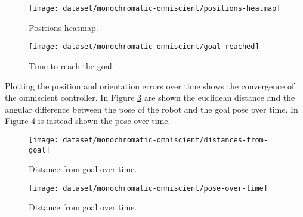 \begin{figure}[htbp]
\centerline{\texttt{[image: dataset/monochromatic-omniscient/positions-heatmap]}}
	\caption{Positions heatmap.}
	\label{fig:densisy-omniscient}
\end{figure}


\begin{figure}[htbp]
\centerline{\texttt{[image: dataset/monochromatic-omniscient/goal-reached]}}
	\caption{Time to reach the goal.}
	\label{fig:goal-reached-omniscient}
\end{figure}

Plotting the position and orientation errors over time shows the convergence of 
the omniscient controller. In Figure \ref{fig:distance-from-goal-omniscient} 
are shown the euclidean distance and the angular difference between the pose of 
the robot and the goal pose over time. In Figure \ref{fig:pose-over-time} is 
instead shown the pose over time.

\begin{figure}[htbp]
	\centerline{\texttt{[image: dataset/monochromatic-omniscient/distances-from-goal]}}
	\caption{Distance from goal over time.}
	\label{fig:distance-from-goal-omniscient}
\end{figure}

\begin{figure}[htbp]
	\centerline{\texttt{[image: dataset/monochromatic-omniscient/pose-over-time]}}
	\caption{Distance from goal over time.}
	\label{fig:pose-over-time}
\end{figure}


